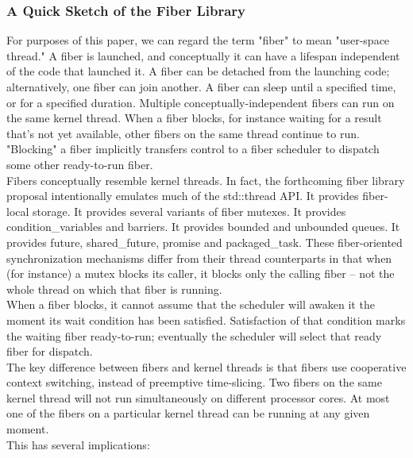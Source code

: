 \subsubsection*{A Quick Sketch of the Fiber Library}
For purposes of this paper, we can regard the term "fiber" to mean "user-space
thread." A fiber is launched, and conceptually it can have a lifespan
independent of the code that launched it. A fiber can be detached from the
launching code; alternatively, one fiber can join another. A fiber can sleep
until a specified time, or for a specified duration. Multiple
conceptually-independent fibers can run on the same kernel thread. When a
fiber blocks, for instance waiting for a result that's not yet available,
other fibers on the same thread continue to run. "Blocking" a fiber implicitly
transfers control to a fiber scheduler to dispatch some other ready-to-run
fiber.\\
\newline
Fibers conceptually resemble kernel threads. In fact, the forthcoming fiber
library proposal intentionally emulates much of the std::thread API. It
provides fiber-local storage. It provides several variants of fiber mutexes.
It provides condition\_variables and barriers. It provides bounded and
unbounded queues. It provides future, shared\_future, promise and
packaged\_task. These fiber-oriented synchronization mechanisms differ from
their thread counterparts in that when (for instance) a mutex blocks its
caller, it blocks only the calling fiber -- not the whole thread on which that
fiber is running.\\
\newline
When a fiber blocks, it cannot assume that the scheduler will awaken it the
moment its wait condition has been satisfied. Satisfaction of that condition
marks the waiting fiber ready-to-run; eventually the scheduler will select
that ready fiber for dispatch.\\
\newline
The key difference between fibers and kernel threads is that fibers use
cooperative context switching, instead of preemptive time-slicing. Two fibers
on the same kernel thread will not run simultaneously on different processor
cores. At most one of the fibers on a particular kernel thread can be running
at any given moment.\\
\newpage
This has several implications:

